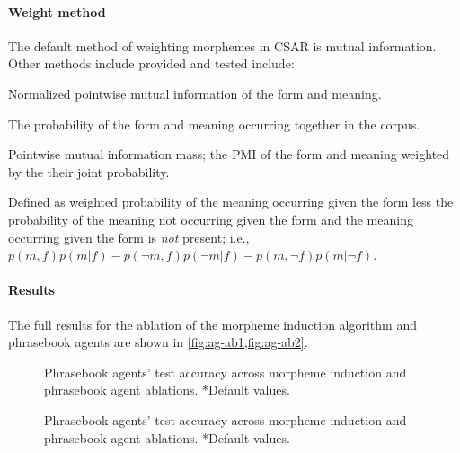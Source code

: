 \paragraph{Weight method}
The default method of weighting morphemes in CSAR is mutual information.
Other methods include provided and tested include:
\medskip
\begin{description}[nosep]
  \item[NPMI] Normalized pointwise mutual information of the form and meaning.
  \item[Joint probability] The probability of the form and meaning occurring together in the corpus.
  \item[PMIM] Pointwise mutual information mass; the PMI of the form and meaning weighted by the their joint probability.
  \item[Applicability] Defined as weighted probability of the meaning occurring given the form less the probability of the meaning not occurring given the form and the meaning occurring given the form is \emph{not} present; i.e., $p(m,f)p(m|f) - p(\neg m,f)p(\neg m|f) - p(m,\neg f)p(m|\neg f)$.
\end{description}

\paragraph{Results}
The full results for the ablation of the morpheme induction algorithm and phrasebook agents are shown in \cref{fig:ag-ab1,fig:ag-ab2}.

\begin{figure}
  \centering
  \caption{Phrasebook agents' test accuracy across morpheme induction and phrasebook agent ablations. *Default values.}%
  \label{fig:ag-ab1}
\end{figure}

\begin{figure}
  \centering
  \caption{Phrasebook agents' test accuracy across morpheme induction and phrasebook agent ablations. *Default values.}%
  \label{fig:ag-ab2}
\end{figure}

